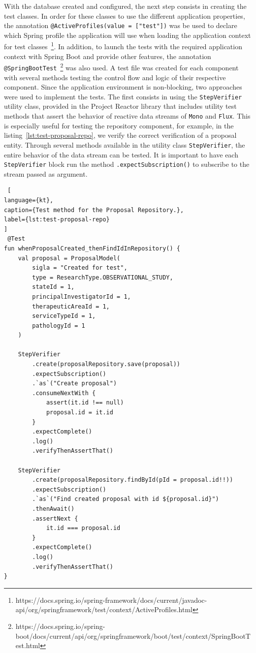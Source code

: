 With the database created and configured, the next step consists in creating the test classes. In order for these classes to use the different application properties, the annotation \lstinline{@ActiveProfiles(value = ["test"])} was be used to declare which Spring profile the application will use when loading the application context for test classes~\footnote{https://docs.spring.io/spring-framework/docs/current/javadoc-api/org/springframework/test/context/ActiveProfiles.html}. In addition, to launch the tests with the required application context with Spring Boot and provide other features, the annotation \lstinline{@SpringBootTest}~\footnote{https://docs.spring.io/spring-boot/docs/current/api/org/springframework/boot/test/context/SpringBootTest.html} was also used. A test file was created for each component with several methods testing the control flow and logic of their respective component. Since the application environment is non-blocking, two approaches were used to implement the tests. The first consists in using the \lstinline{StepVerifier} utility class, provided in the Project Reactor library that includes utility test methods that assert the behavior of reactive data streams of \lstinline{Mono} and \lstinline{Flux}. This is especially useful for testing the repository component, for example, in the listing~\ref{lst:test-proposal-repo}, we verify the correct verification of a proposal entity. Through several methods available in the utility class \lstinline{StepVerifier}, the entire behavior of the data stream can be tested. It is important to have each \lstinline{StepVerifier} block run the method \lstinline{.expectSubscription()} to subscribe to the stream passed as argument.

\begin{lstlisting} [
language={kt},
caption={Test method for the Proposal Repository.},
label={lst:test-proposal-repo}
]
 @Test
fun whenProposalCreated_thenFindIdInRepository() {
    val proposal = ProposalModel(
        sigla = "Created for test",
        type = ResearchType.OBSERVATIONAL_STUDY,
        stateId = 1,
        principalInvestigatorId = 1,
        therapeuticAreaId = 1,
        serviceTypeId = 1,
        pathologyId = 1
    )

    StepVerifier
        .create(proposalRepository.save(proposal))
        .expectSubscription()
        .`as`("Create proposal")
        .consumeNextWith {
            assert(it.id !== null)
            proposal.id = it.id
        }
        .expectComplete()
        .log()
        .verifyThenAssertThat()

    StepVerifier
        .create(proposalRepository.findById(pId = proposal.id!!))
        .expectSubscription()
        .`as`("Find created proposal with id ${proposal.id}")
        .thenAwait()
        .assertNext {
            it.id === proposal.id
        }
        .expectComplete()
        .log()
        .verifyThenAssertThat()
}   
\end{lstlisting}


